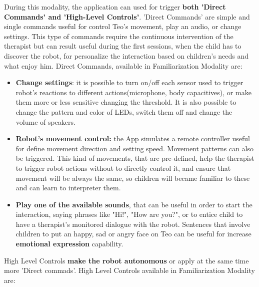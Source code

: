 During this modality, the application can used for trigger \textbf{both 'Direct Commands' and 'High-Level Controls'}. 'Direct Commands' are simple and single commands useful for control Teo's movement, play an audio, or change settings. This type of commands require the continuous intervention of the therapist but can result useful during the first sessions, when the child has to discover the robot, for personalize the interaction based on children's needs and what enjoy him. Direct Commands, available in Familiarization Modality are:
\begin{itemize}	
	\item \textbf{Change settings}: it is possible to turn on/off each sensor used to trigger robot's reactions to different actions(microphone, body capacitives), or make them more or less sensitive changing the threshold. It is also possible to change the pattern and color of  LEDs, switch them off and change the volume of speakers.
	
	
	\item \textbf{Robot's movement control:} the App simulates a remote controller useful for define movement direction and setting speed. Movement patterns can also be triggered. This kind of movements, that are pre-defined, help the therapist to trigger robot actions without to directly control it, and ensure that movement will be always the same, so children will became familiar to these and can learn to interpreter them.  
	
	\item \textbf{Play one of the available sounds}, that can be useful in order to start the interaction, saying phrases like "Hi!", "How are you?", or to entice child to have a therapist's monitored dialogue with the robot. Sentences that involve children to put an happy, sad or angry face on Teo can be useful for increase \textbf{emotional expression} capability.
	
\end{itemize}
High Level Controls \textbf{make the robot autonomous} or apply at the same time more 'Direct commads'. High Level Controls available in Familiarization Modality are:
